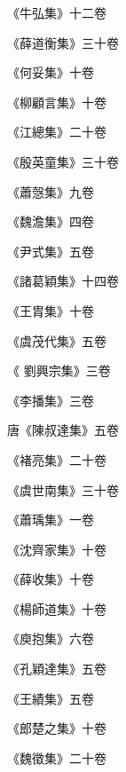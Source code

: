 \begin{pinyinscope}
 《牛弘集》十二卷



 《薛道衡集》三十卷



 《何妥集》十卷



 《柳顧言集》十卷



 《江總集》二十卷



 《殷英童集》三十卷



 《蕭愨集》九卷



 《魏澹集》四卷



 《尹式集》五卷



 《諸葛穎集》十四卷



 《王胄集》十卷



 《虞茂代集》五卷



 《
 劉興宗集》三卷



 《李播集》三卷



 唐《陳叔達集》五卷



 《褚亮集》二十卷



 《虞世南集》三十卷



 《蕭瑀集》一卷



 《沈齊家集》十卷



 《薛收集》十卷



 《楊師道集》十卷



 《庾抱集》六卷



 《孔穎達集》五卷



 《王績集》五卷



 《郎楚之集》十卷



 《魏徵集》二十卷




\end{pinyinscope}
